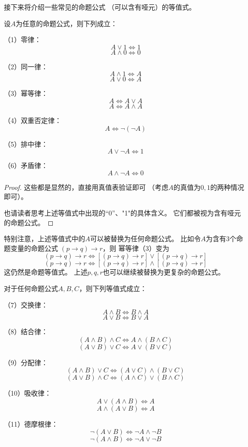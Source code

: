 接下来将介绍一些常见的命题公式
（可以含有哑元）的等值式。

\begin{thm}[基本的命题公式等值式I]\label{prop-dingzhi-gongshi-1}
设$A$为任意的命题公式，则下列成立：

（1）零律：$$A\vee1\Leftrightarrow1$$
$$A\wedge0\Leftrightarrow0$$

（2）同一律：$$A\wedge1\Leftrightarrow A$$
$$A\vee0\Leftrightarrow A$$

（3）幂等律：$$A\Leftrightarrow A\vee A$$
$$A\Leftrightarrow A\wedge A$$

（4）双重否定律：$$A\Leftrightarrow \neg(\neg A)$$

（5）排中律：$$A\vee\neg A\Leftrightarrow1$$

（6）矛盾律：$$A\wedge\neg A\Leftrightarrow0$$

\end{thm}
\begin{proof}
这些都是显然的，直接用真值表验证即可
（考虑$A$的真值为$0,1$的两种情况即可）。

也请读者思考上述等值式中出现的“0”、"1"的具体含义。
它们都被视为含有哑元的命题公式。
\end{proof}

特别注意，上述等值式中的$A$可以被替换为任何命题公式。
比如令$A$为含有3个命题变量的命题公式
$(p\rightarrow q)\rightarrow r$，则
幂等律（3）变为
$$(p\rightarrow q)\rightarrow r
\Leftrightarrow [(p\rightarrow q)\rightarrow r]
\vee [(p\rightarrow q)\rightarrow r]$$
$$(p\rightarrow q)\rightarrow r
\Leftrightarrow [(p\rightarrow q)\rightarrow r]
\wedge [(p\rightarrow q)\rightarrow r]$$
这仍然是命题等值式。
上述$p,q,r$也可以继续被替换为更复杂的命题公式。

\begin{thm}[基本的命题公式等值式II]\label{prop-dengzhi-gongshi-2}
对于任何命题公式$A,B,C$，则下列等值式成立：

（7）交换律：$$A\wedge B\Leftrightarrow B\wedge A$$
$$A\vee B\Leftrightarrow B\vee A$$

（8）结合律：$$(A\wedge B)\wedge C\Leftrightarrow A\wedge (B\wedge C)$$
$$(A\vee B)\vee C\Leftrightarrow A\vee (B\vee C)$$

（9）分配律：
$$(A\wedge B)\vee C\Leftrightarrow (A\vee C)\wedge (B\vee C)$$
$$(A\vee B)\wedge C\Leftrightarrow (A\wedge C)\vee (B\wedge C)$$

（10）吸收律：
$$A\vee (A\wedge B)\Leftrightarrow A$$
$$A\wedge (A\vee B)\Leftrightarrow A$$

（11）德摩根律：
$$\neg(A\vee B)\Leftrightarrow\neg A\wedge\neg B$$
$$\neg(A\wedge B)\Leftrightarrow\neg A\vee\neg B$$

\end{thm}

